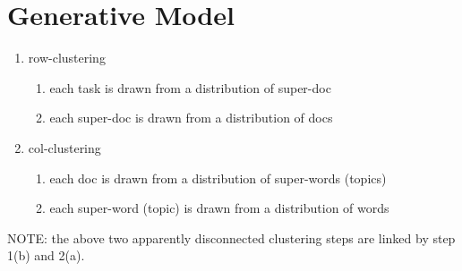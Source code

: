 \documentclass[10pts,fleqn]{article}
\begin{document}
\section{Generative Model}

\begin{enumerate}
	\item row-clustering
	\begin{enumerate}
		\item each task is drawn from a distribution of super-doc
		\item each super-doc is drawn from a distribution of docs
	\end{enumerate}
	\item col-clustering
	\begin{enumerate}
		\item each doc is drawn from a distribution of super-words (topics)
		\item each super-word (topic) is drawn from a distribution of words
	\end{enumerate}
\end{enumerate}
NOTE: the above two apparently disconnected clustering steps are linked by step 1(b) and 2(a).




\end{document}
